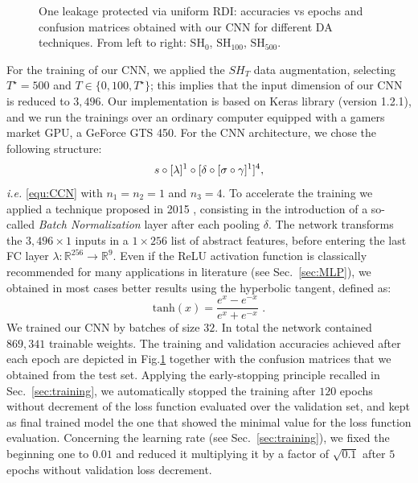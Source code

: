 \begin{figure}[t]
\caption[Software misalignment: accuracies vs epochs and confusion matrices obtained with our CNN for different DA techniques.]{One leakage protected via uniform RDI: accuracies vs epochs and confusion matrices obtained with our CNN for different DA techniques. From left to right: $\mathrm{SH}_0$, $\mathrm{SH}_{100}$, $\mathrm{SH}_{500}$. }\label{fig:CW_shift_history}
\end{figure}

For the training of our CNN, we applied the $SH_T$ data augmentation, selecting $T^\star = 500$ and $T \in \{ 0,100, T^\star\}$; this implies that the input dimension of our CNN is reduced to $3,496$. Our implementation is based on Keras library \cite{keras} (version 1.2.1), and we run the trainings over an ordinary computer equipped with a gamers market GPU, a GeForce GTS 450. For the CNN architecture, we chose the following structure: 
\begin{equation}\label{eq:archi}
  s \circ [\lambda]^1 \circ[\delta \circ [\sigma \circ \gamma  ]^1 ]^4,   
\end{equation}
\emph{i.e.} \eqref{equ:CCN} with $n_1 = n_2 = 1$ and $n_3 = 4$.
To accelerate the training we applied a technique proposed in 2015 \cite{batch_norm}, consisting in the  introduction of a so-called \emph{Batch Normalization} layer \cite{batch_norm} after each pooling $\delta$. The network transforms the $3,496 \times 1$ inputs in a $1 \times 256$ list of abstract features, before entering the last FC layer $\lambda:\mathbb{R}^{256}\rightarrow \mathbb{R}^9$. Even if the ReLU activation function \cite{nair2010rectified} is classically recommended for many applications in literature (see Sec.~\ref{sec:MLP}), we obtained in most cases better results using the hyperbolic tangent, defined as:
\begin{equation}
\mathrm{tanh}(x) = \frac{e^x-e^{-x}}{e^x+e^{-x}} \mbox{ .}
\end{equation}
We trained our CNN by batches of size $32$.  In total the network contained $869,341$ trainable weights. The training and validation accuracies achieved after each epoch are depicted in Fig.\ref{fig:CW_shift_history} together with the confusion matrices that we obtained from the test set. Applying the early-stopping principle recalled in Sec.~\ref{sec:training},  we automatically stopped the training after $120$ epochs without decrement of the loss function evaluated over the validation set, and kept as final trained model the one that showed the minimal value for the loss function evaluation. Concerning the learning rate (see Sec.~\ref{sec:training}), we fixed the beginning one to $0.01$ and reduced it multiplying it by a factor of $\sqrt{0.1}$ after $5$ epochs without validation loss decrement.


